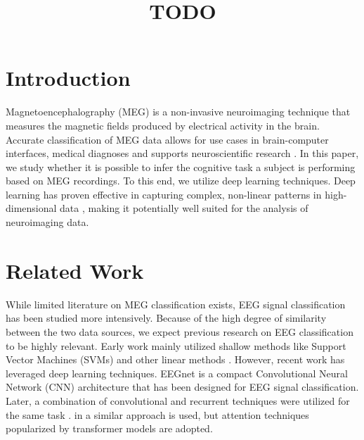\documentclass[conference]{IEEEtran}
\begin{document}
\title{TODO}

\author{
}

\maketitle

\begin{abstract}

\end{abstract}

\section{Introduction}
Magnetoencephalography (MEG) is a non-invasive neuroimaging technique that measures the magnetic fields produced by electrical 
activity in the brain. Accurate classification of MEG data allows for use cases in brain-computer interfaces, medical diagnoses and
supports neuroscientific research \cite{belhadi2025eeg}. In this paper, we study whether it is possible to infer the cognitive task a subject is performing
based  on MEG recordings. To this end, we utilize deep learning techniques. Deep learning has proven effective in capturing complex, non-linear
 patterns in high-dimensional data \cite{lecun2015deep}, making it potentially well suited for the analysis of neuroimaging data. 

\section{Related Work}
While limited literature on MEG classification exists, EEG signal classification has been studied more intensively. Because of the
high degree of similarity between the two data sources, we expect previous research on EEG classification to be highly relevant.
Early work mainly utilized shallow methods like Support Vector Machines (SVMs) and other linear methods \cite{besserve2007classification}.
However, recent work \cite{lawhern2018eegnet} \cite{zhang2018cascade} \cite{abdellaoui2020deepbrainstateclassification}  has leveraged deep learning
techniques. EEGnet \cite{lawhern2018eegnet} is a compact Convolutional Neural Network (CNN) architecture  that has been designed for EEG signal classification. 
 Later, a combination of convolutional and recurrent techniques were utilized for the same task \cite{zhang2018cascade}. in \cite{abdellaoui2020deepbrainstateclassification} a similar approach is used,
but attention techniques popularized by transformer models \cite{vaswani2017attention} are adopted. 
\end{document}
